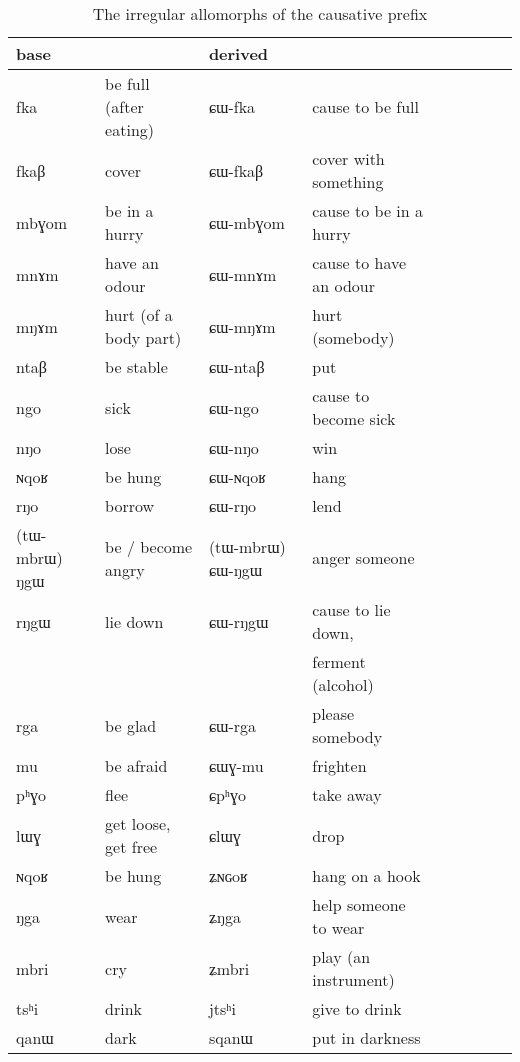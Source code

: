 \documentclass[oldfontcommands,oneside,a4paper,11pt]{memoir}
\newcommand{\ipa}[1]{{\phon #1}} %
\newcommand{\jg}[1]{\ipa{#1}\index{Japhug #1}}
\begin{document}
\begin{table}[H]
\caption{The irregular allomorphs of the causative prefix}\label{tab:causative.irregular}
\begin{tabular}{lllllllll} \toprule
  base & & derived & \\
 \midrule
\jg{fka}  &  be full (after eating) &  \jg{ɕɯ-fka}  &  cause to be full  \\ 
\jg{fkaβ}  &  cover &  \jg{ɕɯ-fkaβ}  &  cover with  something \\ 
\jg{mbɣom}  &  be in a hurry &  \jg{ɕɯ-mbɣom}  & cause to be in a hurry \\ 
\jg{mnɤm}  &  have an odour &  \jg{ɕɯ-mnɤm}  & cause to have an odour \\ 
\jg{mŋɤm}  &   hurt  (of a body part) &  \jg{ɕɯ-mŋɤm}  & hurt (somebody)   \\ 
\jg{ntaβ}  & be stable  &  \jg{ɕɯ-ntaβ}  & put      \\ 
\jg{ngo}  & sick   &  \jg{ɕɯ-ngo}  & cause to become sick  \\ 
\jg{nŋo}  & lose   &  \jg{ɕɯ-nŋo}  & win   \\ 
\jg{ɴqoʁ}  & be hung  &  \jg{ɕɯ-ɴqoʁ}  & hang   \\ 
\jg{rŋo}  & borrow  &  \jg{ɕɯ-rŋo}  & lend     \\ 
\jg{(tɯ-mbrɯ) ŋgɯ}  & be / become angry  &  \jg{(tɯ-mbrɯ) ɕɯ-ŋgɯ}  & anger someone     \\ 
\jg{rŋgɯ}  & lie down  &  \jg{ɕɯ-rŋgɯ}  & cause to lie down, \\
&&&ferment (alcohol)   \\ 
\jg{rga}  & be glad  &  \jg{ɕɯ-rga}  &  please somebody  \\ 
\midrule
\jg{mu}  & be afraid  &  \jg{ɕɯɣ-mu}  & frighten   \\ 
\midrule
\jg{pʰɣo}  &  flee  &  \jg{ɕpʰɣo}  &  take away     \\ 
\jg{lɯɣ}  &  get loose, get free  &  \jg{ɕlɯɣ}  &  drop   \\ 
\midrule
\jg{ɴqoʁ}  & be hung&  \jg{ʑɴɢoʁ}  & hang on a hook  \\ 
\jg{ŋga}  & wear  &  \jg{ʑŋga}  & help someone to wear  \\ 
\jg{mbri}  & cry    &  \jg{ʑmbri}  & play (an instrument) \\ 
\midrule
\jg{tsʰi}  & drink   &  \jg{jtsʰi}  & give to drink  \\ 
\midrule
\jg{qanɯ}  & dark   &  \jg{sqanɯ}  & put in darkness  \\ 
 \bottomrule
\end{tabular}
\end{table}
\end{document}
